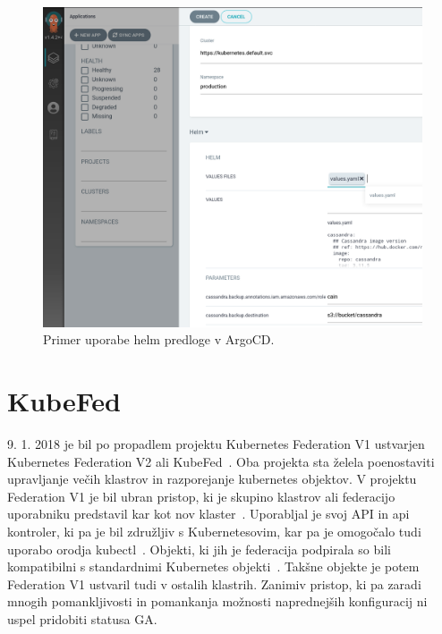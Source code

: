 \documentclass[a4paper, 12pt]{book}
\begin{document}
\begin{figure}[h]
\begin{center}
\includegraphics[width=1.0\textwidth]{images/primer-uporabe-helm-predloge-argo-cd.png}
\end{center}
\caption{Primer uporabe helm predloge v ArgoCD.}
\label{primer-uporabe-helm-predloge-argo-cd}
\end{figure}


\section{KubeFed}
9. 1. 2018 je bil po propadlem projektu Kubernetes Federation V1 ustvarjen Kubernetes Federation V2 ali KubeFed~\cite{kubernetes-federation-evolution}.
Oba projekta sta želela poenostaviti upravljanje večih klastrov in razporejanje kubernetes objektov.
V projektu Federation V1 je bil ubran pristop, ki je skupino klastrov ali federacijo uporabniku predstavil kar kot nov klaster~\cite{setup-cluster-federation-kubefed-v1}.
Uporabljal je svoj API in api kontroler, ki pa je bil združljiv s Kubernetesovim, kar pa je omogočalo tudi uporabo orodja kubectl~\cite{cluster-federation-in-kubernetes-1.5}.
Objekti, ki jih je federacija podpirala so bili kompatibilni s standardnimi Kubernetes objekti~\cite{federated-cluster-kubefed-v1}.
Takšne objekte je potem Federation V1 ustvaril tudi v ostalih klastrih.
Zanimiv pristop, ki pa zaradi mnogih pomankljivosti in pomankanja možnosti naprednejših konfiguracij ni uspel pridobiti statusa GA.
\end{document}
